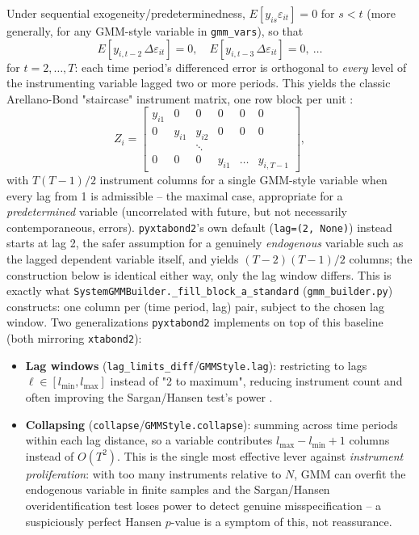 \documentclass[11pt,a4paper]{article}
\newcommand{\pkg}{\texttt{pyxtabond2}}
\newcommand{\bigO}{O}
\begin{document}
Under sequential exogeneity/predeterminedness, $E[y_{is}\varepsilon_{it}]=0$
for $s<t$ (more generally, for any GMM-style variable in \texttt{gmm\_vars}),
so that
\[
  E\!\left[y_{i,t-2}\,\Delta\varepsilon_{it}\right] = 0,\quad
  E\!\left[y_{i,t-3}\,\Delta\varepsilon_{it}\right] = 0,\ \dots
\]
for $t=2,\dots,T$: each time period's differenced error is orthogonal to
\emph{every} level of the instrumenting variable lagged two or more periods.
This yields the classic Arellano-Bond "staircase" instrument matrix, one row
block per unit \citep[matching][their notation, adapted]{Windmeijer2005}:
\[
  Z_i = \begin{bmatrix}
    y_{i1} & 0 & 0 & 0 & 0 & 0\\
    0 & y_{i1} & y_{i2} & 0 & 0 & 0\\
    & & \ddots & & &\\
    0 & 0 & 0 & y_{i1} & \dots & y_{i,T-1}
  \end{bmatrix},
\]
with $T(T-1)/2$ instrument columns for a single GMM-style variable when every
lag from 1 is admissible -- the maximal case, appropriate for a
\emph{predetermined} variable (uncorrelated with future, but not
necessarily contemporaneous, errors). \pkg{}'s own default
(\texttt{lag=(2, None)}) instead starts at lag 2, the safer assumption for a
genuinely \emph{endogenous} variable such as the lagged dependent variable
itself, and yields $(T-2)(T-1)/2$ columns; the construction below is
identical either way, only the lag window differs. This is exactly what
\texttt{SystemGMMBuilder.\_fill\_block\_a\_standard}
(\texttt{gmm\_builder.py}) constructs: one column per (time period, lag)
pair, subject to the chosen lag window. Two generalizations \pkg{}
implements on top of this baseline (both mirroring \texttt{xtabond2}):

\begin{itemize}[nosep]
  \item \textbf{Lag windows} (\texttt{lag\_limits\_diff}/\texttt{GMMStyle.lag}):
    restricting to lags $\ell\in[l_{\min},l_{\max}]$ instead of "2 to
    maximum", reducing instrument count and often improving the Sargan/Hansen
    test's power \citep{Roodman2009b}.
  \item \textbf{Collapsing} (\texttt{collapse}/\texttt{GMMStyle.collapse}):
    summing across time periods within each lag distance, so a variable
    contributes $l_{\max}-l_{\min}+1$ columns instead of $\bigO(T^2)$.
    This is the single most effective lever against \emph{instrument
    proliferation}: with too many instruments relative to $N$, GMM can
    overfit the endogenous variable in finite samples and the Sargan/Hansen
    overidentification test loses power to detect genuine misspecification
    \citep{Roodman2009b} -- a suspiciously perfect Hansen $p$-value is a
    symptom of this, not reassurance.
\end{itemize}
\end{document}
